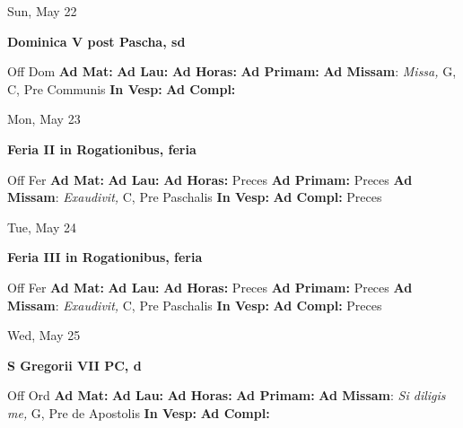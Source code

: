 \documentclass[10pt]{article}
\begin{document}
\begin{minipage}{3.5in}
\vspace{2em}\begin{center}
Sun, May 22
\end{center}\textbf{ \large Dominica V post Pascha, \textnormal{\normalsize sd}}
\begin{justify}
Off Dom
\textbf{Ad Mat: }
\textbf{Ad Lau: }
\textbf{Ad Horas: }
\textbf{Ad Primam: }
\textbf{Ad Missam}: \textit{Missa,} G, C, Pre Communis
\textbf{In Vesp: }
\textbf{Ad Compl: }\end{justify}
\end{minipage}



\begin{minipage}{3.5in}
\vspace{2em}\begin{center}
Mon, May 23
\end{center}\textbf{ \large Feria II in Rogationibus, \textnormal{\normalsize feria}}
\begin{justify}
Off Fer
\textbf{Ad Mat: }
\textbf{Ad Lau: }
\textbf{Ad Horas: }Preces
\textbf{Ad Primam: }Preces
\textbf{Ad Missam}: \textit{Exaudivit,} C, Pre Paschalis
\textbf{In Vesp: }
\textbf{Ad Compl: }Preces\end{justify}
\end{minipage}



\begin{minipage}{3.5in}
\vspace{2em}\begin{center}
Tue, May 24
\end{center}\textbf{ \large Feria III in Rogationibus, \textnormal{\normalsize feria}}
\begin{justify}
Off Fer
\textbf{Ad Mat: }
\textbf{Ad Lau: }
\textbf{Ad Horas: }Preces
\textbf{Ad Primam: }Preces
\textbf{Ad Missam}: \textit{Exaudivit,} C, Pre Paschalis
\textbf{In Vesp: }
\textbf{Ad Compl: }Preces\end{justify}
\end{minipage}



\begin{minipage}{3.5in}
\vspace{2em}\begin{center}
Wed, May 25
\end{center}\textbf{ \large S Gregorii VII PC, \textnormal{\normalsize d}}
\begin{justify}
Off Ord
\textbf{Ad Mat: }
\textbf{Ad Lau: }
\textbf{Ad Horas: }
\textbf{Ad Primam: }
\textbf{Ad Missam}: \textit{Si diligis me,} G, Pre de Apostolis
\textbf{In Vesp: }
\textbf{Ad Compl: }\end{justify}
\end{minipage}
\end{document}
